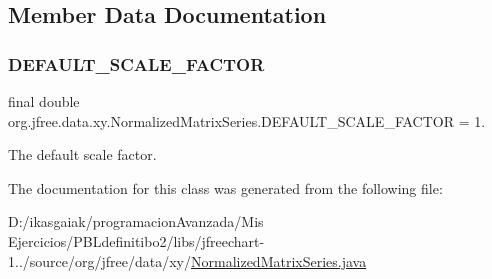 \subsection{Member Data Documentation}
\mbox{\label{classorg_1_1jfree_1_1data_1_1xy_1_1_normalized_matrix_series_ad4891de503293749cbd2410a7e3c7bec}} 
\subsubsection{\texorpdfstring{D\+E\+F\+A\+U\+L\+T\+\_\+\+S\+C\+A\+L\+E\+\_\+\+F\+A\+C\+T\+OR}{DEFAULT\_SCALE\_FACTOR}}
{\footnotesize\ttfamily final double org.\+jfree.\+data.\+xy.\+Normalized\+Matrix\+Series.\+D\+E\+F\+A\+U\+L\+T\+\_\+\+S\+C\+A\+L\+E\+\_\+\+F\+A\+C\+T\+OR = 1.\hspace{0.3cm}{\ttfamily [static]}}

The default scale factor. 

The documentation for this class was generated from the following file\+:\begin{DoxyCompactItemize}
\item 
D\+:/ikasgaiak/programacion\+Avanzada/\+Mis Ejercicios/\+P\+B\+Ldefinitibo2/libs/jfreechart-\/1../source/org/jfree/data/xy/\mbox{\hyperlink{_normalized_matrix_series_8java}{Normalized\+Matrix\+Series.\+java}}\end{DoxyCompactItemize}
